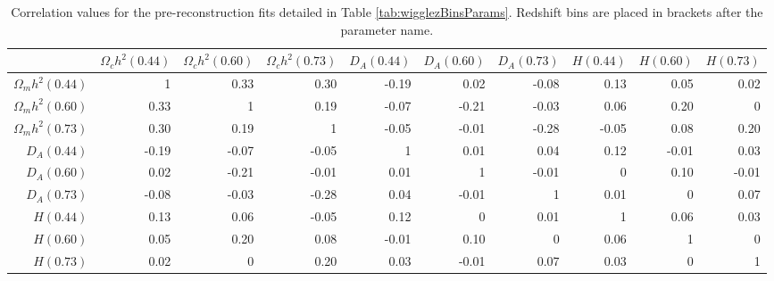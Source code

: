 \documentclass[a4paper,fleqn,usenatbib]{mnras}
\begin{document}
\begin{table}
	\centering
	\caption{Correlation values for the pre-reconstruction fits detailed in Table \ref{tab:wigglezBinsParams}. Redshift bins are placed in brackets after the parameter name.}
	\label{tab:cor}
	\begin{tabular}{rrrrrrrrrr}
		\hline
		~ & $\Omega_c h^2(0.44)$ &  $\Omega_c h^2(0.60)$ &   $\Omega_c h^2(0.73)$ &   $D_A(0.44)$ &   $D_A(0.60)$ &   $D_A(0.73)$ &    $H(0.44)$ &   $H(0.60)$ &   $H(0.73)$ \\
		\hline
	    $\Omega_m h^2(0.44)$ &      1    &        0.33 &        0.30 &       -0.19 &        0.02 &       -0.08 &        0.13 &        0.05 &        0.02 \\
	    $\Omega_m h^2(0.60)$ &      0.33 &        1    &        0.19 &       -0.07 &       -0.21 &       -0.03 &        0.06 &        0.20 &        0    \\
	    $\Omega_m h^2(0.73)$ &      0.30 &        0.19 &        1    &       -0.05 &       -0.01 &       -0.28 &       -0.05 &        0.08 &        0.20 \\
	    $D_A(0.44)$          &     -0.19 &       -0.07 &       -0.05 &        1    &        0.01 &        0.04 &        0.12 &       -0.01 &        0.03 \\
	    $D_A(0.60)$          &      0.02 &       -0.21 &       -0.01 &        0.01 &        1    &       -0.01 &        0    &        0.10 &       -0.01 \\
	    $D_A(0.73)$          &     -0.08 &       -0.03 &       -0.28 &        0.04 &       -0.01 &        1    &        0.01 &        0    &        0.07 \\
        $H(0.44)$            &      0.13 &        0.06 &       -0.05 &        0.12 &        0    &        0.01 &        1    &        0.06 &        0.03 \\
	    $H(0.60)$            &      0.05 &        0.20 &        0.08 &       -0.01 &        0.10 &        0    &        0.06 &        1    &        0    \\
	    $H(0.73)$            &      0.02 &        0    &        0.20 &        0.03 &       -0.01 &        0.07 &        0.03 &        0    &        1    \\
		\hline
	\end{tabular}
\end{table}

\bsp	%
\label{lastpage}
\end{document}

